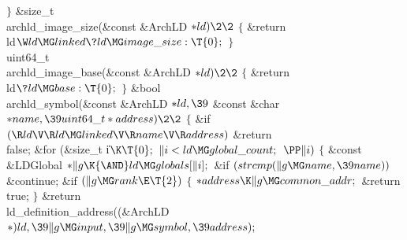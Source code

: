 \4${}\}{}$\2\7
\1\1\&{size\_t} \\{archld\_image\_size}(\&{const} \&{ArchLD} ${}{*}\\{ld})\2%
\2{}$\6
${}\{{}$\1\6
\&{return} \\{ld}${}\W\\{ld}\MG\\{linked}\?\\{ld}\MG\\{image\_size}:\T{0};{}$\6
\4${}\}{}$\2\7
\1\1\\{uint64\_t}\\{archld\_image\_base}(\&{const} \&{ArchLD} ${}{*}\\{ld})\2%
\2{}$\6
${}\{{}$\1\6
\&{return} \\{ld}${}\?\\{ld}\MG\\{base}:\T{0};{}$\6
\4${}\}{}$\2\7
\1\1\&{bool} \\{archld\_symbol}(\&{const} \&{ArchLD} ${}{*}\\{ld},\39{}$%
\&{const} \&{char} ${}{*}\\{name},\39\\{uint64\_t}*\\{address})\2\2{}$\6
${}\{{}$\1\6
\&{if} ${}(\R\\{ld}\V\R\\{ld}\MG\\{linked}\V\R\\{name}\V\R\\{address}){}$\1\5
\&{return} \\{false};\2\6
\&{for} (\&{size\_t} \|i${}\K\T{0};{}$ ${}\|i<\\{ld}\MG\\{global\_count};{}$
${}\PP\|i){}$\5
${}\{{}$\1\6
\&{const} \&{LDGlobal} ${}{*}\|g\K{\AND}\\{ld}\MG\\{globals}[\|i];{}$\7
\&{if} ${}(\\{strcmp}(\|g\MG\\{name},\39\\{name})){}$\1\5
\&{continue};\2\6
\&{if} ${}(\|g\MG\\{rank}\E\T{2}){}$\5
${}\{{}$\1\6
${}{*}\\{address}\K\|g\MG\\{common\_addr};{}$\6
\&{return} \\{true};\6
\4${}\}{}$\2\6
\&{return} \\{ld\_definition\_address}((\&{ArchLD} ${}{*})\,\\{ld},\39\|g\MG%
\\{input},\39\|g\MG\\{symbol},\39\\{address});{}$\6
